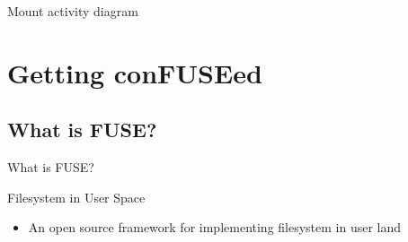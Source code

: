 \documentclass{beamer}
\begin{document}
\begin{frame}{Mount activity diagram}
	
	
\end{frame}


\section{Getting conFUSEed}

\subsection{What is FUSE?}

\begin{frame}{What is FUSE?}

	\begin{block}{Filesystem in User Space}

		\begin{itemize}[<+->]

			\item{An open source framework for implementing filesystem in user land}\footnotemark[1]
	
		\end{itemize}

	\end{block}


\end{frame}
\end{document}
